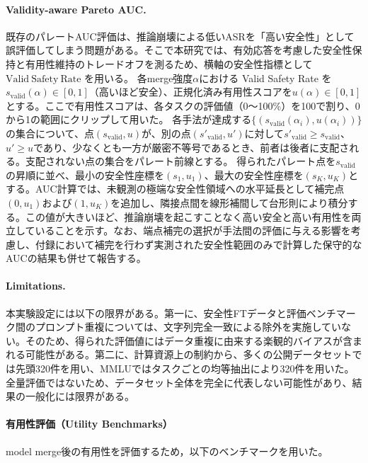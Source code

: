 \documentclass{article}
\begin{document}
\paragraph{Validity-aware Pareto AUC.}
既存のパレートAUC評価は、推論崩壊による低いASRを「高い安全性」として誤評価してしまう問題がある。そこで本研究では、有効応答を考慮した安全性保持と有用性維持のトレードオフを測るため、横軸の安全性指標として $\mathrm{Valid\ Safety\ Rate}$ を用いる。
各merge強度\(\alpha\)における Valid Safety Rate を\(s_{\mathrm{valid}}(\alpha) \in [0,1]\)（高いほど安全）、正規化済み有用性スコアを\(u(\alpha) \in [0,1]\)とする。ここで有用性スコアは、各タスクの評価値（0〜100\%）を100で割り、0から1の範囲にクリップして用いた。
各手法が達成する\(\{(s_{\mathrm{valid}}(\alpha_i), u(\alpha_i))\}\)の集合について、点\((s_{\mathrm{valid}},u)\)が、別の点\((s'_{\mathrm{valid}},u')\)に対して\(s'_{\mathrm{valid}}\ge s_{\mathrm{valid}}\)、\(u'\ge u\)であり、少なくとも一方が厳密不等号であるとき、前者は後者に支配される。支配されない点の集合をパレート前線とする。
得られたパレート点を\(s_{\mathrm{valid}}\)の昇順に並べ、最小の安全性座標を\((s_1,u_1)\)、最大の安全性座標を\((s_K,u_K)\)とする。AUC計算では、未観測の極端な安全性領域への水平延長として補完点\((0,u_1)\)および\((1,u_K)\)を追加し、隣接点間を線形補間して台形則により積分する。この値が大きいほど、推論崩壊を起こすことなく高い安全と高い有用性を両立していることを示す。なお、端点補完の選択が手法間の評価に与える影響を考慮し、付録において補完を行わず実測された安全性範囲のみで計算した保守的なAUCの結果も併せて報告する。

\paragraph{Limitations.}
本実験設定には以下の限界がある。第一に、安全性FTデータと評価ベンチマーク間のプロンプト重複については、文字列完全一致による除外を実施していない。そのため、得られた評価値にはデータ重複に由来する楽観的バイアスが含まれる可能性がある。第二に、計算資源上の制約から、多くの公開データセットでは先頭320件を用い、MMLUではタスクごとの均等抽出により320件を用いた。全量評価ではないため、データセット全体を完全に代表しない可能性があり、結果の一般化には限界がある。
\paragraph{有用性評価（Utility Benchmarks）}
model merge後の有用性を評価するため，以下のベンチマークを用いた。
\end{document}
